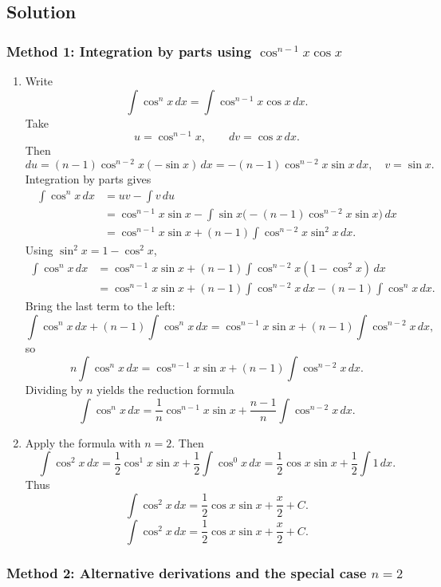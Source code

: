 \documentclass[12pt]{article}
\begin{document}
\subsection*{Solution}

\subsubsection*{Method 1: Integration by parts using \(\cos^{n-1}x\cos x\)}

\begin{enumerate}[label=(\alph*)]
\item Write
\[
\int \cos^{n}x\,dx
= \int \cos^{n-1}x\cos x\,dx.
\]
Take
\[
u=\cos^{n-1}x,\qquad dv=\cos x\,dx.
\]
Then
\[
du=(n-1)\cos^{n-2}x(-\sin x)\,dx = -(n-1)\cos^{n-2}x\sin x\,dx,
\quad v=\sin x.
\]
Integration by parts gives
\begin{align*}
\int \cos^{n}x\,dx
&= uv-\int v\,du\\
&= \cos^{n-1}x\sin x - \int \sin x\big(-(n-1)\cos^{n-2}x\sin x\big)\,dx\\
&= \cos^{n-1}x\sin x + (n-1)\int \cos^{n-2}x\sin^{2}x\,dx.
\end{align*}
Using \(\sin^{2}x=1-\cos^{2}x\),
\begin{align*}
\int \cos^{n}x\,dx
&= \cos^{n-1}x\sin x + (n-1)\int \cos^{n-2}x(1-\cos^{2}x)\,dx\\
&= \cos^{n-1}x\sin x + (n-1)\int \cos^{n-2}x\,dx - (n-1)\int \cos^{n}x\,dx.
\end{align*}
Bring the last term to the left:
\[
\int \cos^{n}x\,dx + (n-1)\int \cos^{n}x\,dx
= \cos^{n-1}x\sin x + (n-1)\int \cos^{n-2}x\,dx,
\]
so
\[
n\int \cos^{n}x\,dx
= \cos^{n-1}x\sin x + (n-1)\int \cos^{n-2}x\,dx.
\]
Dividing by \(n\) yields the reduction formula
\[
\boxed{\displaystyle
\int \cos^{n}x\,dx
= \frac{1}{n}\cos^{n-1}x\sin x
+ \frac{n-1}{n}\int \cos^{n-2}x\,dx.}
\]

\item Apply the formula with \(n=2\). Then
\[
\int \cos^{2}x\,dx
= \frac{1}{2}\cos^{1}x\sin x
+ \frac{1}{2}\int \cos^{0}x\,dx
= \frac{1}{2}\cos x\sin x + \frac{1}{2}\int 1\,dx.
\]
Thus
\[
\int \cos^{2}x\,dx
= \frac{1}{2}\cos x\sin x + \frac{x}{2} + C.
\]
\[
\boxed{\displaystyle \int \cos^{2}x\,dx
= \frac{1}{2}\cos x\sin x + \frac{x}{2} + C.}
\]
\end{enumerate}

\subsubsection*{Method 2: Alternative derivations and the special case \(n=2\)}
\end{document}
